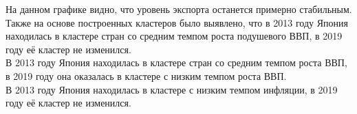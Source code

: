 \newpage

На данном графике видно, что уровень экспорта останется примерно стабильным.\\

Также на основе построенных кластеров было выявлено, что в 2013 году Япония находилась в кластере стран со средним темпом роста подушевого ВВП, в 2019 году её кластер не изменился.\\

В 2013 году Япония находилась в кластере стран со средним темпом роста ВВП, в 2019 году она оказалась в кластере с низким темпом роста ВВП.\\

В 2013 году Япония находилась в кластере с низким темпом инфляции, в 2019 году её кластер не изменился.